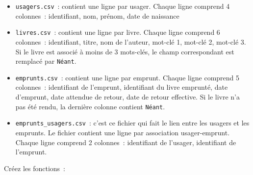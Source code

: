 \documentclass[10pt,a4paper]{sujets-exercices}
\begin{document}
\begin{itemize}
\item \texttt{usagers.csv}~: contient une ligne par usager. Chaque ligne comprend 4 colonnes~: identifiant, nom, prénom, date de naissance
\item \texttt{livres.csv}~: contient une ligne par livre. Chaque ligne comprend 6 colonnes~: identifiant, titre, nom de l'auteur, mot-clé 1, mot-clé 2, mot-clé 3. Si le livre est associé à moins de 3 mots-clés, le champ correspondant est remplacé par \texttt{Néant}.
\item \texttt{emprunts.csv}~: contient une ligne par emprunt. Chaque ligne comprend 5 colonnes~: identifiant de l'emprunt, identifiant du livre emprunté, date d'emprunt, date attendue de retour, date de retour effective. Si le livre n'a pas été rendu, la dernière colonne contient \texttt{Néant}. 
\item \texttt{emprunts\_usagers.csv}~: c'est ce fichier qui fait le lien entre les usagers et les emprunts. Le fichier contient une ligne par association usager-emprunt. Chaque ligne comprend 2 colonnes~: identifiant de l'usager, identifiant de l'emprunt.
\end{itemize}

Créez les fonctions~:
\end{document}

